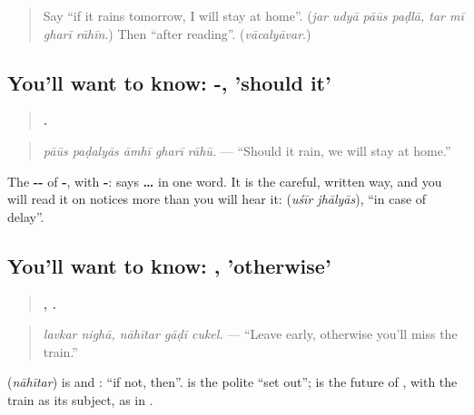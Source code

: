 \label{lesson:MR-C286-padlyas}



\begin{quote}
Say \textquotedblleft{}if it rains tomorrow, I will stay at home\textquotedblright{}. (\emph{jar udyā pāūs paḍlā, tar mī gharī rāhīn}.) Then \textquotedblleft{}after reading\textquotedblright{}. (\emph{vācalyāvar}.)
\end{quote}

\subsection*{You'll want to know: -, 'should it'}
\begin{quote}
\textbf{    .}
\end{quote}

\begin{quote}
\emph{pāūs paḍalyās āmhī gharī rāhū.} — \textquotedblleft{}Should it rain, we will stay at home.\textquotedblright{}
\end{quote}

The \textbf{--} of \textbf{-}, with \textbf{-}: \textbf{} says \textbf{ …  } in one word. It is the careful, written way, and you will read it on notices more than you will hear it: \textbf{ } (\emph{uśīr jhālyās}), \textquotedblleft{}in case of delay\textquotedblright{}.

\subsection*{You'll want to know: , 'otherwise'}
\begin{quote}
\textbf{ ,   .}
\end{quote}

\begin{quote}
\emph{lavkar nighā, nāhītar gāḍī cukel.} — \textquotedblleft{}Leave early, otherwise you'll miss the train.\textquotedblright{}
\end{quote}

\textbf{} (\emph{nāhītar}) is \textbf{} and \textbf{}: \textquotedblleft{}if not, then\textquotedblright{}. \textbf{} is the polite \textquotedblleft{}set out\textquotedblright{}; \textbf{} is the future of \textbf{}, with the train as its subject, as in \textbf{  }.

